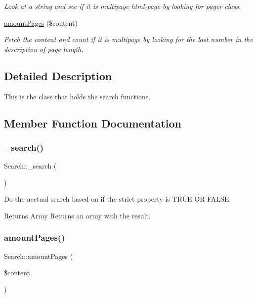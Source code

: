 \begin{DoxyCompactItemize}
\begin{DoxyCompactList}\small\item\em Look at a string and see if it is multipage html-\/page by looking for pager class. \end{DoxyCompactList}\item 
\hyperlink{class_search_acb6f51d3e3311922bec40d096b0bac99}{amount\+Pages} (\$content)
\begin{DoxyCompactList}\small\item\em Fetch the content and count if it is multipage by looking for the last number in the description of page length. \end{DoxyCompactList}\end{DoxyCompactItemize}


\subsection{Detailed Description}
This is the class that holds the search functions. 

\subsection{Member Function Documentation}
\hypertarget{class_search_a80725b6a32dfc685558764d47002d9c0}{}\label{class_search_a80725b6a32dfc685558764d47002d9c0} 
\subsubsection{\texorpdfstring{\+\_\+search()}{\_search()}}
{\footnotesize\ttfamily Search\+::\+\_\+search (\begin{DoxyParamCaption}{ }\end{DoxyParamCaption})}



Do the acctual search based on if the strict property is T\+R\+UE OR F\+A\+L\+SE. 

\begin{DoxyReturn}{Returns}
Array Returns an array with the result. 
\end{DoxyReturn}
\hypertarget{class_search_acb6f51d3e3311922bec40d096b0bac99}{}\label{class_search_acb6f51d3e3311922bec40d096b0bac99} 
\subsubsection{\texorpdfstring{amount\+Pages()}{amountPages()}}
{\footnotesize\ttfamily Search\+::amount\+Pages (\begin{DoxyParamCaption}\item[{}]{\$content }\end{DoxyParamCaption})\hspace{0.3cm}{\ttfamily [private]}}



